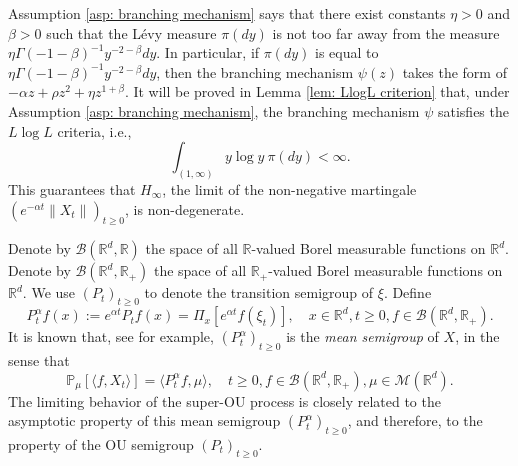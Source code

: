 \documentclass[12pt,a4paper]{amsart}
\theoremstyle{plain}
\theoremstyle{definition}
\numberwithin{equation}{section}
\begin{document}
    Assumption \ref{asp: branching mechanism} says that 
 there exist constants $\eta>0$ and $\beta > 0$ 
    such that the L\'evy measure $\pi(dy)$ is not too far away from the measure $\eta \Gamma(-1-\beta)^{-1}y^{-2-\beta} dy$.
    In particular, if $\pi(dy)$ is equal to $\eta \Gamma(-1-\beta)^{-1}y^{-2-\beta} dy$, then the branching mechanism $\psi(z)$
    takes the form of
	$-\alpha z + \rho z^2 + \eta z^{1+\beta}$.
	It will be proved in Lemma \ref{lem: LlogL criterion} that, under Assumption \ref{asp: branching mechanism}, the branching mechanism $\psi$ satisfies the $L \log L$ criteria, i.e.,
\[
	\int_{(1,\infty)} y\log y~\pi(dy) < \infty.
\]
    This guarantees that $H_\infty$, the limit of the non-negative martingale $(e^{-\alpha t} \|X_t\|)_{t\geq 0}$, is non-degenerate. 

    Denote by $\mathcal B(\mathbb R^d, \mathbb R)$ the space of all $\mathbb R$-valued Borel measurable functions on $\mathbb R^d$.
    Denote by $\mathcal B(\mathbb R^d, \mathbb R_+)$ the space of all $\mathbb R_+$-valued Borel measurable functions on $\mathbb R^d$.
    We use  $(P_t)_{t\geq 0}$ to denote the transition semigroup of $\xi$.	
    Define
\begin{equation}
\label{eq: meansemigroup}
    P^{\alpha}_t f(x)
    :=
    e^{\alpha t} P_t f(x) =
    \Pi_x [e^{\alpha t}f(\xi_t)],
    \quad x\in \mathbb R^d,t\geq 0, f\in \mathcal B(\mathbb R^d, \mathbb R_+).
\end{equation}
    It is known that, see \cite[Proposition 2.27]{Li2011Measure-valued} for example, $(P^\alpha_t)_{t\geq 0}$ is the \emph{mean semigroup} of $X$, in the sense that
\begin{equation}
    \mathbb{P}_{\mu}[\langle f, X_t \rangle]
    = \langle P^\alpha_t f, \mu \rangle,
    \quad t\geq 0, f\in \mathcal B(\mathbb R^d, \mathbb R_+), \mu \in \mathcal M(\mathbb R^d).
\end{equation}
        The limiting behavior of the super-OU process is closely related to the asymptotic property of this mean semigroup $(P^\alpha_t)_{t\geq 0}$, and therefore, to the property of the OU semigroup $(P_t)_{t\geq 0}$.
\end{document}
